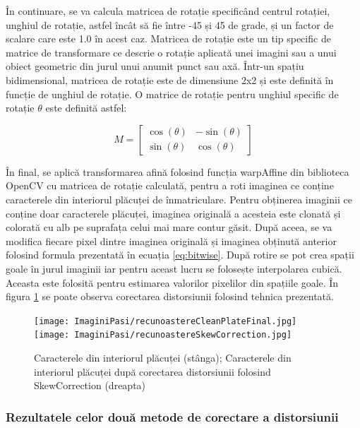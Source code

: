 \documentclass[12pt]{article}
\begin{document}
\^{I}n continuare, se va calcula matricea de rotație specific\^{a}nd centrul rotației, unghiul de rotație, astfel \^{i}nc\^{a}t s\u{a} fie \^{i}ntre -45 și 45 de grade, și un factor de scalare care este 1.0 \^{i}n acest caz. Matricea de rotație este un tip specific de matrice de transformare ce descrie o rotație aplicat\u{a} unei imagini sau a unui obiect geometric din jurul unui anumit punct sau ax\u{a}. \^{I}ntr-un spațiu bidimensional, matricea de rotație este de dimensiune 2x2 și este definit\u{a} \^{i}n funcție de unghiul de rotație. O matrice de rotație pentru unghiul specific de rotație \ensuremath{\theta} este definit\u{a} astfel:

\begin{equation}
M =
\begin{bmatrix}
\cos(\theta) & -\sin(\theta) \\
\sin(\theta) & \cos(\theta)
\end{bmatrix}
\end{equation}

\^{I}n final, se aplic\u{a} transformarea afin\u{a} folosind funcția warpAffine din biblioteca OpenCV cu matricea de rotație calculat\u{a}, pentru a roti imaginea ce conține caracterele din interiorul pl\u{a}cuței de \^{i}nmatriculare. Pentru obținerea imaginii ce conține doar caracterele pl\u{a}cuței, imaginea original\u{a} a acesteia este clonat\u{a} și colorat\u{a} cu alb pe suprafața celui mai mare contur g\u{a}sit. Dup\u{a} aceea, se va modifica fiecare pixel dintre imaginea original\u{a} și imaginea obținut\u{a} anterior folosind formula prezentat\u{a} \^{i}n ecuația \ref{eq:bitwise}. Dup\u{a} rotire se pot crea spații goale \^{i}n jurul imaginii iar pentru aceast lucru se folosește interpolarea cubic\u{a}. Aceasta este folosit\u{a} pentru estimarea valorilor pixelilor din spațiile goale. \^{I}n figura \ref{fig:recunoastere_rezultat_skew} se poate observa corectarea distorsiunii folosind tehnica prezentat\u{a}.

\begin{figure}[H]
  \centering
  \texttt{[image: ImaginiPasi/recunoastereCleanPlateFinal.jpg]}\hfill
    \texttt{[image: ImaginiPasi/recunoastereSkewCorrection.jpg]}
  \caption{Caracterele din interiorul pl\u{a}cuței (st\^{a}nga); Caracterele din interiorul pl\u{a}cuței dup\u{a} corectarea distorsiunii folosind SkewCorrection (dreapta)}
  \label{fig:recunoastere_rezultat_skew}
\end{figure}

\subsubsection{Rezultatele celor dou\u{a} metode de corectare a distorsiunii}
\end{document}
